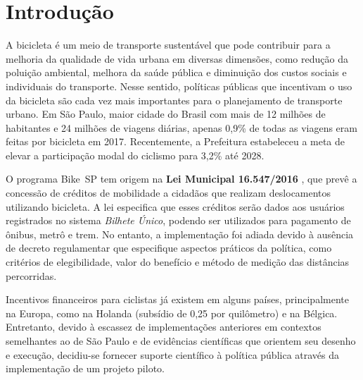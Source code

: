 

\chapter{Introdução}
\label{cap:introducao-bikesp}

A bicicleta é um meio de transporte sustentável que pode contribuir para a
melhoria da qualidade de vida urbana em diversas dimensões, como redução da
poluição ambiental, melhora da saúde pública e diminuição dos custos sociais e
individuais do transporte. Nesse sentido, políticas públicas que incentivam o
uso da bicicleta são cada vez mais importantes para o planejamento de transporte
urbano\citep{sheller2018, jeekel2017}. Em São Paulo, maior cidade do Brasil com
mais de 12 milhões de habitantes e 24 milhões de viagens diárias, apenas 0,9\%
de todas as viagens eram feitas por bicicleta em 2017\citep{metro2017}.
Recentemente, a Prefeitura estabeleceu a meta de elevar a participação modal do
ciclismo para 3,2\% até 2028\citep{saopauloCityHall2022}.

O programa Bike~SP tem origem na \textbf{Lei Municipal 16.547/2016}
\citep{municipalLegislation2016}, que prevê a concessão de créditos de
mobilidade a cidadãos que realizam deslocamentos utilizando bicicleta. A lei
especifica que esses créditos serão dados aos usuários registrados no sistema
\emph{Bilhete Único}, podendo ser utilizados para pagamento de ônibus, metrô e
trem. No entanto, a implementação foi adiada devido à ausência de decreto
regulamentar que especifique aspectos práticos da política, como critérios de
elegibilidade, valor do benefício e método de medição das distâncias percorridas.

Incentivos financeiros para ciclistas já existem em alguns países, principalmente
na Europa, como na Holanda (subsídio de \texteuro{}0,25 por quilômetro) e na
Bélgica\citep{tennant2022, brusselsTimes2022}. Entretanto, devido à escassez de
implementações anteriores em contextos semelhantes ao de São Paulo e de
evidências científicas que orientem seu desenho e execução, decidiu-se fornecer
suporte científico à política pública através da implementação de um projeto
piloto\citep{faria2023:bikespCaseStudy, pearson2020}.


